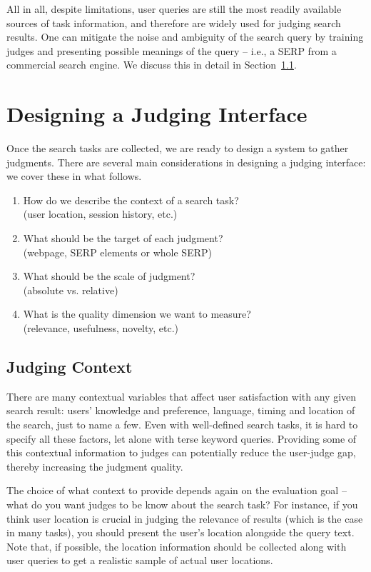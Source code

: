 \documentclass[openany]{now} %
\newcommand{\authornote}[3]{\marginpar{\tiny\color{#1}#2: #3}{\color{#1}{$\star$}}}
\newcommand{\paul}[1]{\authornote{blue}{Paul}{#1}}
\begin{document}
All in all, despite limitations, user queries are still the most readily available sources of task information, and therefore are widely used for judging search results. One can mitigate the noise and ambiguity of the search query by training judges and presenting possible meanings of the query -- i.e., a SERP from a commercial search engine. We discuss this in detail in Section~\ref{s:judging-context}.

\section{Designing a Judging Interface}

Once the search tasks are collected, we are ready to design a system to gather judgments. There are several main considerations in designing a judging interface: we cover these in what follows.

\begin{enumerate}
	\item  How do we describe the context of a search task? \\(user location, session history, etc.)
	\item  What should be the target of each judgment? \\(webpage, SERP elements or whole SERP)
	\item  What should be the scale of judgment? \\(absolute vs. relative)	
	\item  What is the quality dimension we want to measure? \\(relevance, usefulness, novelty, etc.)
\end{enumerate}

\subsection{Judging Context}
\label{s:judging-context}
There are many contextual variables that affect user satisfaction with any given search result: users' knowledge and preference, language, timing and location of the search, just to name a few. Even with well-defined search tasks, it is hard to specify all these factors, let alone with terse keyword queries. Providing some of this contextual information to judges can potentially reduce the user-judge gap, thereby increasing the judgment quality. \paul{refs?} 

The choice of what context to provide depends again on the evaluation goal -- what do you want judges to be know about the search task? For instance, if you think user location is crucial in judging the relevance of results (which is the case in many tasks), you should present the user's location alongside the query text. Note that, if possible, the location information should be collected along with user queries to get a realistic sample of actual user locations.
\end{document}
